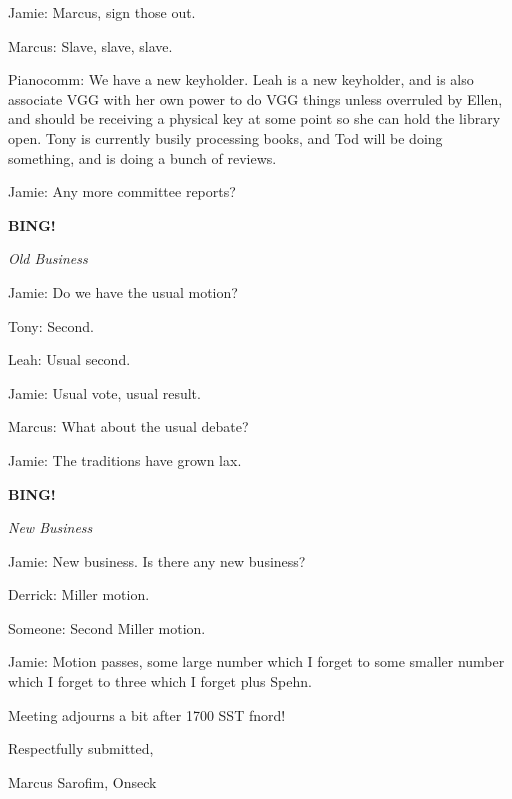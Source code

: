 \documentclass[12pt]{article}
\newcommand{\bing}{{\bf BING!} }
\newcommand{\goto}[1]{\bing \vskip 12pt \centerline{{\em{#1}}}}
\begin{document}
Jamie: Marcus, sign those out.

Marcus: Slave, slave, slave.

Pianocomm: We have a new keyholder. Leah is a new keyholder, and is also associate VGG with her own power to do VGG things unless overruled by Ellen, and should be receiving a physical key at some point so she can hold the library open. Tony is currently busily processing books, and Tod will be doing something, and is doing a bunch of reviews.

Jamie: Any more committee reports?

\goto{Old Business}

Jamie: Do we have the usual motion?

Tony: Second.

Leah: Usual second.

Jamie: Usual vote, usual result.

Marcus: What about the usual debate?

Jamie: The traditions have grown lax.

\goto{New Business}

Jamie: New business. Is there any new business?

Derrick: Miller motion.

Someone: Second Miller motion.

Jamie: Motion passes, some large number which I forget to some smaller number which I forget to three which I forget plus Spehn.

\vspace{12pt}

\noindent
Meeting adjourns a bit after 1700 SST fnord!

\vspace{18pt}

\centerline{Respectfully submitted,}
\centerline{Marcus Sarofim, Onseck}
\end{document}
